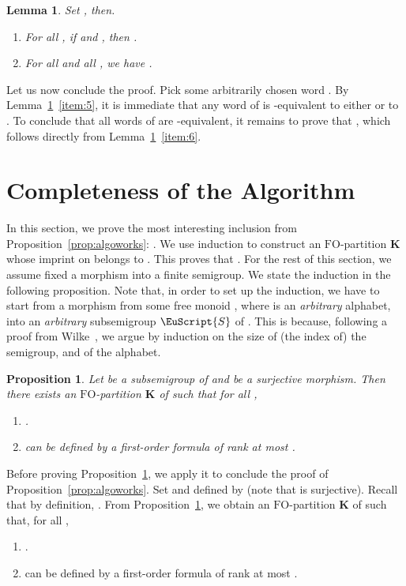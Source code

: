 \documentclass{CSML}
\newcommand\Ss{\ensuremath{\EuScript{S}}\xspace}
\newcommand\Kb{\ensuremath{\mathbf{K}}\xspace}
\newcommand{\fo}{\ensuremath{\text{FO}}\xspace}
\theoremstyle{plain}
\newtheorem{proposition}[thm]{Proposition}
\newtheorem{lemma}[thm]{Lemma}
\begin{document}
\begin{lemma} \label{lem:efconcat}
Set , then.
  \begin{enumerate}
  \item\label{item:5} For all , if
     and , then .
  \item\label{item:6} For all  and all , we have .
  \end{enumerate}
\end{lemma}

Let us now conclude the proof. Pick some arbitrarily chosen word .  By
Lemma~\ref{lem:efconcat}~\ref{item:5}, it is immediate that any word of 
is -equivalent to either  or to
. To conclude that all words of
 are -equivalent, it remains to prove that ,
which follows directly from Lemma~\ref{lem:efconcat}~\ref{item:6}.

\section{Completeness of the Algorithm}
\label{sec:comp}
In this section, we prove the most interesting inclusion from
Proposition~\ref{prop:algoworks}: . We use
induction to construct an \fo-partition \Kb whose imprint on  belongs
to . This proves that
. For the rest
of this section, we assume fixed a morphism  into a
finite semigroup. We state the induction in the following proposition. Note
that, in order to set up the induction, we have to start from a morphism from
some free monoid , where  is an \emph{arbitrary} alphabet, into an \emph{arbitrary}
subsemigroup \Ss of . This is because, following a proof from
Wilke~\cite{wfo}, we argue by induction on the size of (the index of) the
semigroup, and of the alphabet.

\begin{proposition} \label{prop:pumping}
Let  be a subsemigroup of  and  be a surjective morphism. Then there exists an \fo-partition \Kb
of  such that for all ,

\begin{enumerate}
\item\label{it:c1} .
\item\label{it:c2}  can be defined by a first-order formula
  of rank at most .
\end{enumerate}
\end{proposition}

Before proving Proposition~\ref{prop:pumping}, we apply it to conclude
the proof of Proposition~\ref{prop:algoworks}. Set  and  defined by
 (note that  is surjective). Recall
that by definition, . From
Proposition~\ref{prop:pumping}, we obtain an \fo-partition \Kb of 
such that, for all ,
\begin{enumerate}
\item\label{it:c1alpha} .
\item\label{it:c2alpha}  can be defined by a first-order formula
  of rank at most .
\end{enumerate}
\end{document}
